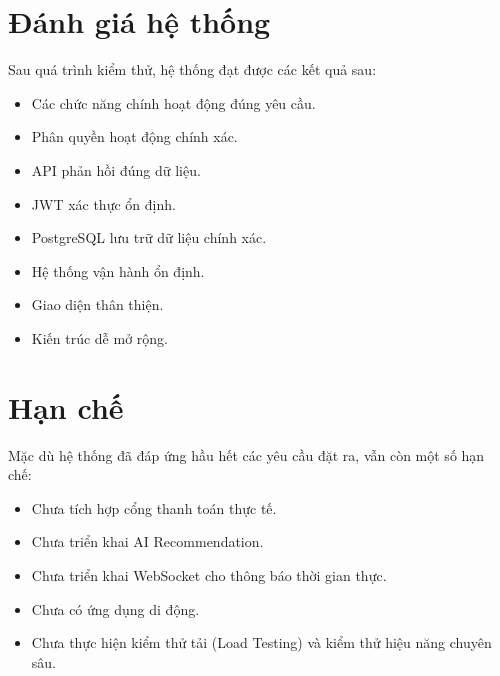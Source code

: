 
\section{Đánh giá hệ thống}

Sau quá trình kiểm thử, hệ thống đạt được các kết quả sau:

\begin{itemize}

\item Các chức năng chính hoạt động đúng yêu cầu.

\item Phân quyền hoạt động chính xác.

\item API phản hồi đúng dữ liệu.

\item JWT xác thực ổn định.

\item PostgreSQL lưu trữ dữ liệu chính xác.

\item Hệ thống vận hành ổn định.

\item Giao diện thân thiện.

\item Kiến trúc dễ mở rộng.

\end{itemize}


\section{Hạn chế}

Mặc dù hệ thống đã đáp ứng hầu hết các yêu cầu đặt ra, vẫn còn một số hạn chế:

\begin{itemize}

\item Chưa tích hợp cổng thanh toán thực tế.

\item Chưa triển khai AI Recommendation.

\item Chưa triển khai WebSocket cho thông báo thời gian thực.

\item Chưa có ứng dụng di động.

\item Chưa thực hiện kiểm thử tải (Load Testing) và kiểm thử hiệu năng chuyên sâu.

\end{itemize}


